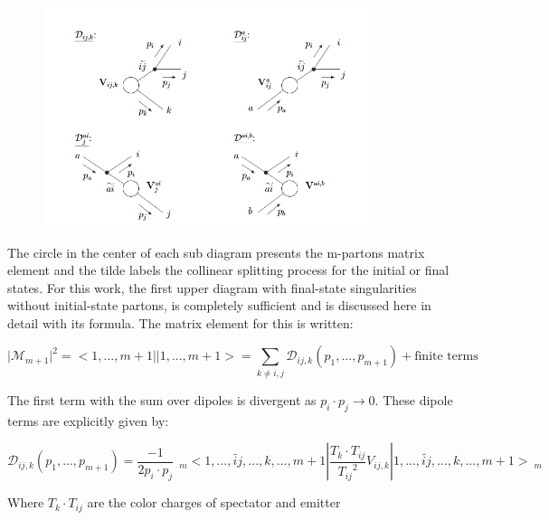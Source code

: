 \begin{figure}[h!]
\centering
\includegraphics[width=0.85\textwidth]{images/Intro/Dipole.png}
\end{figure}

The circle in the center of each sub diagram presents the m-partons matrix element and the tilde labels the collinear splitting process for the initial or final states.
For this work, the first upper diagram with final-state singularities without initial-state partons, is completely sufficient and is discussed here in detail with its formula.
The matrix element for this is written:

\begin{equation}
\vert {{\mathcal{M}}}_{m+1}  \vert^2 = < 1,...,m+1 || 1,...,m+1 > = \sum_{k \neq i,j} {{\mathcal{D}}}_{ij,k}(p_1,...,p_{m+1}) +\text{finite terms}
\end{equation}

The first term with the sum over dipoles is divergent as $ p_i \cdot p_j \rightarrow 0 $. These dipole terms are explicitly given by:

\begin{equation}
 {{\mathcal{D}}}_{ij,k}(p_1,...,p_{m+1}) = \frac{-1}{2p_i \cdot p_j} \:\:_m<1,...,\tilde{ij},...,k,...,m+1 |\frac{T_k \cdot T_{ij}}{{T_{ij}}^2} V_{ij,k}| 1,...,\tilde{ij},...,k,...,m+1 >\:_m
\end{equation}

Where $ T_k \cdot T_{ij} $ are the color charges of spectator and emitter

